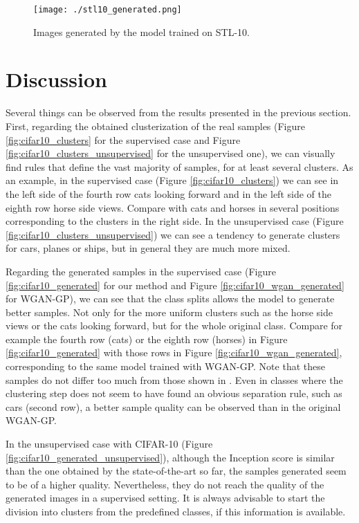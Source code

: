 \documentclass[times,twocolumn]{article}
\begin{document}
\begin{figure}
 \centering
 \texttt{[image: ./stl10\_generated.png]}
\caption{Images generated by the model trained on STL-10.}
\label{fig:stl10_generated}
\end{figure}

\section{Discussion}
Several things can be observed from the results presented in the previous section.
First, regarding the obtained clusterization of the real samples (Figure \ref {fig:cifar10_clusters} for the supervised case and Figure \ref{fig:cifar10_clusters_unsupervised} for the unsupervised one), we can visually find rules that define the vast majority of samples, for at least several clusters.
As an example, in the supervised case (Figure \ref{fig:cifar10_clusters}) we can see in the left side of the fourth row cats looking forward and in the left side of the eighth row horse side views. Compare with cats and horses in several positions corresponding to the clusters in the right side.
In the unsupervised case (Figure \ref{fig:cifar10_clusters_unsupervised}) we can see a tendency to generate clusters for cars, planes or ships, but in general they are much more mixed.


Regarding the generated samples in the supervised case (Figure \ref{fig:cifar10_generated} for our method and Figure \ref{fig:cifar10_wgan_generated} for WGAN-GP), we can see that the class splits allows the model to generate better samples. Not only for the more uniform clusters such as the horse side views or the cats looking forward, but for the whole original class. Compare for example the fourth row (cats) or the eighth row (horses) in Figure \ref{fig:cifar10_generated} with those rows in Figure \ref{fig:cifar10_wgan_generated}, corresponding to the same model trained with WGAN-GP.
Note that these samples do not differ too much from those shown in \cite{Gulrajani2017}. Even in classes where the clustering step does not seem to have found an obvious separation rule, such as cars (second row), a better sample quality can be observed than in the original WGAN-GP.

In the unsupervised case with CIFAR-10 (Figure \ref{fig:cifar10_generated_unsupervised}), although the Inception score is similar than the one obtained by the state-of-the-art so far, the samples generated seem to be of a higher quality. Nevertheless, they do not reach the quality of the generated images in a supervised setting. It is always advisable to start the division into clusters from the predefined classes, if this information is available.
\end{document}

